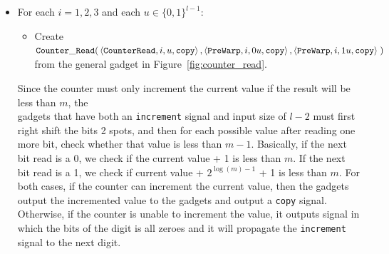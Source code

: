 \begin{itemize}

    \item For each $i = 1,2,3$ and each $u \in \{0, 1\}^{l-1}$:

    \begin{itemize}
        \item Create $\begin{aligned}[t]
            {\tt Counter\_Read}(& \left\langle {\tt CounterRead}, i,  u, {\tt copy} \right\rangle,
                     \left\langle {\tt PreWarp},     i, 0u, {\tt copy} \right\rangle,
                     \left\langle {\tt PreWarp},     i, 1u, {\tt copy} \right\rangle \;)
        \end{aligned}$\\from the general gadget in Figure~\ref{fig:counter_read}.
    \end{itemize}


Since the counter must only increment the current value if the result will be less than $m$,
the \\{\cread} gadgets that have both an {\tt increment} signal and input size of $l - 2$ must
first right shift the bits 2 spots, and then for each possible value after reading one more bit,
check whether that value is less than $m - 1$. %
%
Basically, if the next bit read is a 0, we check if the current value + 1 is less than $m$.
%
%
%
%
%
%
%
If the next bit read is a 1, we check if current value + $2^{\log (m) - 1}$ + 1 is less than $m$.
%
For both cases, if the counter can increment the current value, then
the {\cread} gadgets output the incremented value to the {\prewarp} gadgets and output a {\tt copy}
signal. Otherwise, if the counter is unable to increment the value, it outputs signal in which the bits
of the digit is all zeroes and it will propagate the {\tt increment} signal to the next digit.


\end{itemize}
